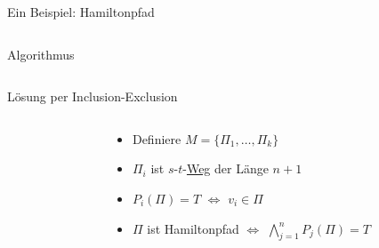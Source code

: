 \documentclass[table,german,10pt]{beamer}
\begin{document}
\begin{frame}{Ein Beispiel: Hamiltonpfad}
\begin{columns}
\begin{column}{7cm}
\begin{block}{Algorithmus}
      \end{block}
    \end{column}
  \end{columns}
\end{frame}
\begin{frame}{Lösung per Inclusion-Exclusion}
  \begin{columns}
    \begin{column}{5cm}
      \begin{center}
      \end{center}
      
    \end{column}
    \begin{column}{7cm}
      \begin{itemize}[<+->]
      \item Definiere $M=\{\Pi_{1},\ldots,\Pi_{k}\}$
      \item $\Pi_{i}$ ist $s$-$t$-\underline{Weg} der Länge $n+1$
      \item $P_{i}(\Pi)=T$ $\Leftrightarrow$ $v_{i}\in \Pi$
      \item $\Pi$ ist Hamiltonpfad $\Leftrightarrow$ $\bigwedge_{j=1}^{n}P_{j}(\Pi)=T$
      \end{itemize}
    \end{column}
  \end{columns}
\end{frame}
\end{document}
